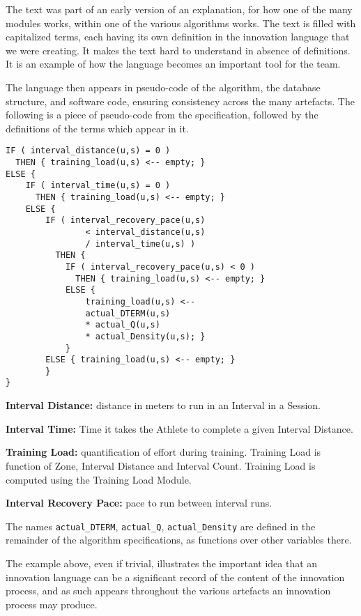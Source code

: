 \documentclass[graybox,envcountchap,sectrefs]{svmono}
\begin{document}
The text was part of an early version of an explanation, for how one of the many modules works, within one of the various algorithms works. The text is filled with capitalized terms, each having its own definition in the innovation language that we were creating. It makes the text hard to understand in absence of definitions. It is an example of how the language becomes an important tool for the team. 

The language then appears in pseudo-code of the algorithm, the database structure, and software code, ensuring consistency across the many artefacts. The following is a piece of pseudo-code from the specification, followed by the definitions of the terms which appear in it.

\small{
\begin{verbatim}
IF ( interval_distance(u,s) = 0 ) 
  THEN { training_load(u,s) <-- empty; }
ELSE {
    IF ( interval_time(u,s) = 0 ) 
      THEN { training_load(u,s) <-- empty; }
    ELSE {
        IF ( interval_recovery_pace(u,s)
                < interval_distance(u,s) 
                / interval_time(u,s) )
          THEN {
            IF ( interval_recovery_pace(u,s) < 0 ) 
              THEN { training_load(u,s) <-- empty; }
            ELSE {
                training_load(u,s) <-- 
                actual_DTERM(u,s) 
                * actual_Q(u,s) 
                * actual_Density(u,s); }
            }
        ELSE { training_load(u,s) <-- empty; } 
        }
}
\end{verbatim}}

\begin{svgraybox}
\noindent\textbf{Interval Distance:} distance in meters to run in an Interval in a Session.

\noindent\textbf{Interval Time:} Time it takes the Athlete to complete a given Interval Distance.

\noindent\textbf{Training Load:} quantification of effort during training. Training Load is function of Zone, Interval Distance and Interval Count. Training Load is computed using the Training Load Module.

\noindent\textbf{Interval Recovery Pace:} pace to run between interval runs.
\end{svgraybox}

The names \verb|actual_DTERM|, \verb|actual_Q|, \verb|actual_Density| are defined in the remainder of the algorithm specifications, as functions over other variables there.

The example above, even if trivial, illustrates the important idea that an innovation language can be a significant record of the content of the innovation process, and as such appears throughout the various artefacts an innovation process may produce.
\end{document}
